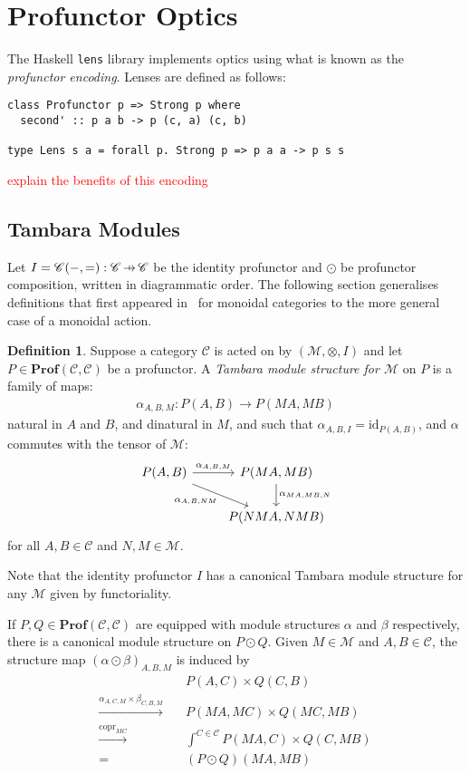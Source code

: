 \documentclass[11pt,letterpaper]{article}
\theoremstyle{plain}
\theoremstyle{definition}
\newtheorem{definition}[theorem]{Definition}
\newcommand{\C}{\mathscr{C}}
\newcommand{\M}{\mathscr{M}}
\newcommand{\lenslib}{\texttt{lens}}
\newcommand{\Prof}{\mathbf{Prof}}
\newcommand{\id}{\mathrm{id}}
\DeclareMathOperator{\copr}{copr}
\newcommand{\hto}{\ensuremath{\,\mathaccent\shortmid\rightarrow\,}}
\newcommand{\todo}[1]{\textcolor{red}{\small #1}}
\begin{document}
\section{Profunctor Optics}\label{sec:profunctor-optics}
The Haskell \lenslib{} library implements optics using what is known as the \emph{profunctor encoding}. Lenses are defined as follows:

\begin{verbatim}
class Profunctor p => Strong p where
  second' :: p a b -> p (c, a) (c, b)

type Lens s a = forall p. Strong p => p a a -> p s s
\end{verbatim}

\todo{explain the benefits of this encoding}

\subsection{Tambara Modules}
Let $I = \C(-,{=}) : \C \hto \C$ be the identity profunctor and $\odot$ be profunctor composition, written in diagrammatic order. The following section generalises definitions that first appeared in~\cite[Section 3]{Doubles} for monoidal categories to the more general case of a monoidal action.

\begin{definition}
  Suppose a category $\C$ is acted on by $(\M, \otimes, I)$ and let $P \in \Prof(\C, \C)$ be a profunctor. A \emph{Tambara module structure for $\M$} on $P$ is a family of maps:
  \begin{align*}
    \alpha_{A,B,M} : P(A,B) \to P(MA, MB)
  \end{align*}
  natural in $A$ and $B$, and dinatural in $M$, and such that $\alpha_{A,B,I} = \id_{P(A,B)}$, and $\alpha$ commutes with the tensor of $\M$:
  \[
    \begin{tikzcd}
      P(A,B) \ar[r, "\alpha_{A,B,M}"] \ar[dr, "\alpha_{A, B, NM}" below left] & P(MA, MB) \ar[d, "\alpha_{MA, MB, N}" right] \\
      & P(NMA, NMB)
    \end{tikzcd}
  \]
  for all $A, B \in \C$ and $N, M \in \M$.
\end{definition}

Note that the identity profunctor $I$ has a canonical Tambara module structure for any $\M$ given by functoriality.

If $P, Q \in \Prof(\C, \C)$ are equipped with module structures $\alpha$ and $\beta$ respectively, there is a canonical module structure on $P \odot Q$. Given $M \in \M$ and $A,B \in \C$, the structure map ${(\alpha \odot \beta)}_{A,B,M}$ is induced by
\begin{align*}
  &P(A,C) \times Q(C,B)  \\
  \xrightarrow{\alpha_{A,C,M} \times \beta_{C,B,M}} \quad& P(MA, MC) \times Q(MC, MB) \\
  \xrightarrow{\copr_{MC}} \quad&\int^{C \in \C} P(MA, C) \times Q(C, MB) \\
  = \quad&(P \odot Q)(MA, MB)
\end{align*}
\end{document}
